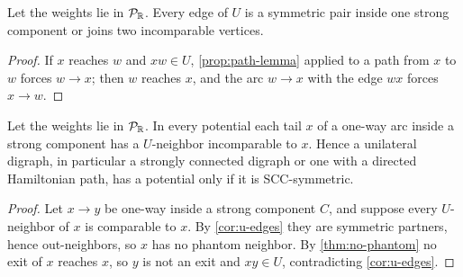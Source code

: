 \begin{corollary}\label{cor:u-edges}
Let the weights lie in $\mathcal{P}_{\mathbb{R}}$. Every edge of $U$ is a symmetric pair inside one strong component or joins two incomparable vertices.
\end{corollary}
\begin{proof}
If $x$ reaches $w$ and $xw\in U$, \cref{prop:path-lemma} applied to a path from $x$ to $w$ forces $w\to x$; then $w$ reaches $x$, and the arc $w\to x$ with the edge $wx$ forces $x\to w$.
\end{proof}

\begin{corollary}\label{cor:unilateral}
Let the weights lie in $\mathcal{P}_{\mathbb{R}}$. In every potential each tail $x$ of a one-way arc inside a strong component has a $U$-neighbor incomparable to $x$. Hence a unilateral digraph, in particular a strongly connected digraph or one with a directed Hamiltonian path, has a potential only if it is SCC-symmetric.
\end{corollary}
\begin{proof}
Let $x\to y$ be one-way inside a strong component $C$, and suppose every $U$-neighbor of $x$ is comparable to $x$. By \cref{cor:u-edges} they are symmetric partners, hence out-neighbors, so $x$ has no phantom neighbor. By \cref{thm:no-phantom} no exit of $x$ reaches $x$, so $y$ is not an exit and $xy\in U$, contradicting \cref{cor:u-edges}.
\end{proof}

